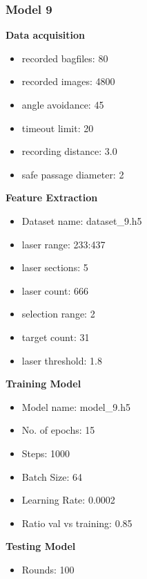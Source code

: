 \subsubsection{Model 9\label{model_9} }
\begin{multicols}{2}\textbf{Data acquisition}
\begin{itemize}
\setlength\itemsep{0.1em}
\item recorded bagfiles: 80
\item recorded images: 4800
\item angle avoidance: 45
\item timeout limit: 20
\item recording distance: 3.0
\item safe passage diameter: 2
\end{itemize}
\textbf{Feature Extraction}
\begin{itemize}
\setlength\itemsep{0.1em}
\item Dataset name: dataset\_9.h5
\item  laser range: 233:437
\item  laser sections: 5
\item  laser count: 666
\item  selection range: 2
\item  target count: 31
\item  laser threshold: 1.8
\end{itemize}
\columnbreak\textbf{Training Model}
\begin{itemize}
\setlength\itemsep{0.1em}
\item  Model name: model\_9.h5
\item  No. of epochs: 15
\item  Steps: 1000
\item  Batch Size: 64
\item  Learning Rate: 0.0002
\item  Ratio val vs training: 0.85
\end{itemize}
\textbf{Testing Model}
\begin{itemize}
\setlength\itemsep{0.1em}
\item Rounds: 100
\newline
\newline
\newline
\newline
\newline
\newline
\newline
\newline
\end{itemize}

\end{multicols}
